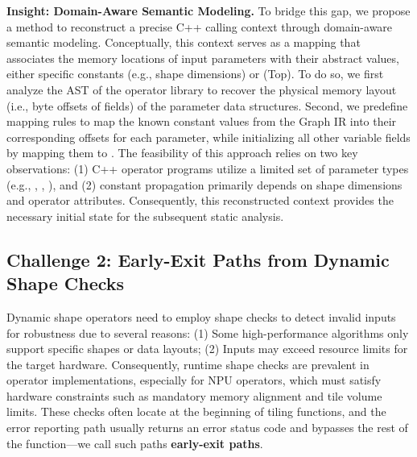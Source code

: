 \textbf{Insight: Domain-Aware Semantic Modeling.}
To bridge this gap, we propose a method to reconstruct a precise C++ calling context through domain-aware semantic modeling.
Conceptually, this context serves as a mapping that associates the memory locations of input parameters with their abstract values, either specific constants (e.g., shape dimensions) or  (Top).
To do so, we first analyze the AST of the operator library to recover the physical memory layout (i.e., byte offsets of fields) of the parameter data structures.
Second, we predefine mapping rules to map the known constant values from the Graph IR into their corresponding offsets for each parameter, while initializing all other variable fields by mapping them to .
The feasibility of this approach relies on two key observations: (1) C++ operator programs utilize a limited set of parameter types (e.g., , , ), and (2) constant propagation primarily depends on shape dimensions and operator attributes. 
Consequently, this reconstructed context provides the necessary initial state for the subsequent static analysis.

\subsection{Challenge 2: Early-Exit Paths from Dynamic Shape Checks}
\label{sec:motivation:early-exit}

Dynamic shape operators need to employ shape checks to detect invalid inputs for robustness due to several reasons:
(1) Some high-performance algorithms only support specific shapes or data layouts; 
(2) Inputs may exceed resource limits for the target hardware.
Consequently, runtime shape checks are prevalent in operator implementations, especially for NPU operators, which must satisfy hardware constraints such as mandatory memory alignment and tile volume limits.
These checks often locate at the beginning of tiling functions, and the error reporting path usually returns an error status code and bypasses the rest of the function---we call such paths \textbf{early-exit paths}.

